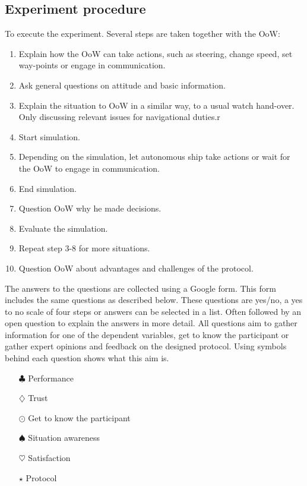 \subsection{Experiment procedure}
To execute the experiment. Several steps are taken together with the \acf{OoW}:
\begin{enumerate}
	\item Explain how the OoW can take actions, such as steering, change speed, set way-points or engage in communication.
	\item Ask general questions on attitude and basic information.
	\item Explain the situation to OoW in a similar way, to a usual watch hand-over. Only discussing relevant issues for navigational duties.r
	\item Start simulation.
	\item Depending on the simulation, let autonomous ship take actions or wait for the OoW to engage in communication.
	\item End simulation.
	\item Question OoW why he made decisions.
	\item Evaluate the simulation.
	\item Repeat step 3-8 for more situations.
	\item Question OoW about advantages and challenges of the protocol.
\end{enumerate}
The answers to the questions are collected using a Google form. This form includes the same questions as described below. These questions are yes/no, a yes to no scale of four steps or answers can be selected in a list. Often followed by an open question to explain the answers in more detail. 
All questions aim to gather information for one of the dependent variables, get to know the participant or gather expert opinions and feedback on the designed protocol. Using symbols behind each question shows what this aim is.
\begin{multicols}{2}
	\begin{itemize}
		\item[$\clubsuit$] Performance
		\item[$\diamondsuit$] Trust
		\item[$\odot$] Get to know the participant
		\item[$\spadesuit$] Situation awareness
		\item[$\heartsuit$] Satisfaction
		\item[$\star$] Protocol
	\end{itemize}
\end{multicols}



